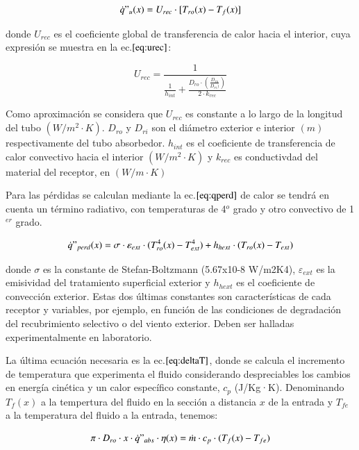 \begin{equation}
    \dot{q}"_{u}(x)= U_{rec} \cdot [T_{ro}(x)-T_{f}(x)] \label{eq:qu}
\end{equation}

donde \(U_{rec}\) es el coeficiente global de transferencia de calor hacia el interior, cuya expresión se muestra en la ec.\(\eqref{eq:urec}\):

\begin{equation}
    U_{rec} = \frac{1}{\frac{1}{h_{int}} + \frac{D_{ro}\cdot(\frac{D_{ro}}{D_{ri})})}{2\cdot k_{rec}}} \label{eq:urec}
\end{equation}

Como aproximación se considera que \(U_{rec}\) es constante a lo largo de la longitud del tubo \((W/m^{2}\cdot K)\). \(D_{ro}\) y \(D_{ri}\) son el diámetro exterior e interior \((m)\) respectivamente del tubo absorbedor. \(h_{int}\) es el coeficiente de transferencia de calor convectivo hacia el interior \((W/m^{2}\cdot K)\) y \(k_{rec}\) es conductivdad del material del receptor, en \((W/m\cdot K)\)

Para las pérdidas se calculan mediante la ec.\(\eqref{eq:qperd}\) de calor se tendrá en cuenta un término radiativo, con temperaturas de 4$^o$ grado y otro convectivo de 1$^{er}$ grado. 

\begin{equation}
    \dot{q}"_{perd}(x)= \sigma \cdot \varepsilon_{ext} \cdot (T_{ro}^{4}(x)-T_{ext}^{4}) + h_{hext} \cdot (T_{ro}(x)-T_{ext}) \label{eq:qperd}
\end{equation}

donde \(\sigma\) es la constante de Stefan-Boltzmann (5.67x10-8 W/m2K4), \(\varepsilon_{ext}\) es la emisividad del tratamiento superficial exterior y \(h_{hext}\) es el coeficiente de convección exterior. Estas dos últimas constantes son características de cada receptor y variables, por ejemplo, en función de las condiciones de degradación del recubrimiento selectivo o del viento exterior. Deben ser halladas experimentalmente en laboratorio.

La última ecuación necesaria es la ec.\(\eqref{eq:deltaT}\), donde se calcula el incremento de temperatura que experimenta el fluido considerando despreciables los cambios en energía cinética y un calor específico constante, \(c_{p}\) (J/Kg·K). Denominando \(T_{f}(x)\) a la tempertura del fluido en la sección a distancia \(x\) de la entrada y \(T_{fe}\) a la temperatura del fluido a la entrada, tenemos:

\begin{equation}
    \pi \cdot D_{ro} \cdot x \cdot \dot{q}"_{abs} \cdot \eta(x)= \dot{m} \cdot c_{p} \cdot (T_{f}(x)-T_{fe}) \label{eq:deltaT}
\end{equation}\\

